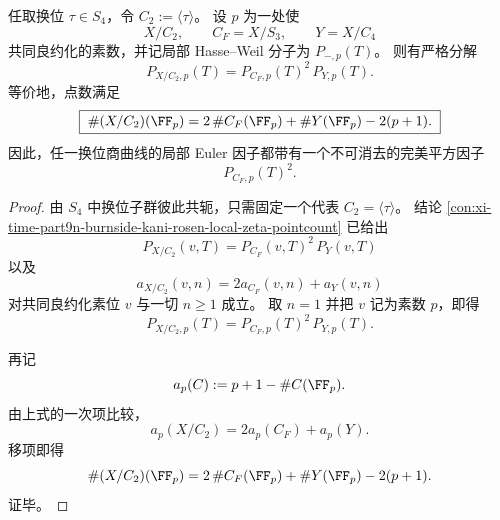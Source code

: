 \begin{theorem}\label{thm:conclusion-s4-transposition-quotient-square-euler-factor}
任取换位 \(\tau\in S_4\)，令 \(C_2:=\langle\tau\rangle\)。
设 \(p\) 为一处使
\[
X/C_2,\qquad C_F=X/S_3,\qquad Y=X/C_4
\]
共同良约化的素数，并记局部 Hasse--Weil 分子为 \(P_{-,p}(T)\)。
则有严格分解
\[
\boxed{\;
P_{X/C_2,p}(T)=P_{C_F,p}(T)^2\,P_{Y,p}(T).\;}
\]
等价地，点数满足
\[
\boxed{\;
\#(X/C_2)(\FF_p)
=
2\,\#C_F(\FF_p)+\#Y(\FF_p)-2(p+1).\;}
\]
因此，任一换位商曲线的局部 Euler 因子都带有一个不可消去的完美平方因子
\[
P_{C_F,p}(T)^2.
\]
\end{theorem}
\begin{proof}
由 \(S_4\) 中换位子群彼此共轭，只需固定一个代表 \(C_2=\langle\tau\rangle\)。
结论 \ref{con:xi-time-part9n-burnside-kani-rosen-local-zeta-pointcount} 已给出
\[
P_{X/C_2}(v,T)=P_{C_F}(v,T)^2\,P_Y(v,T)
\]
以及
\[
a_{X/C_2}(v,n)=2a_{C_F}(v,n)+a_Y(v,n)
\]
对共同良约化素位 \(v\) 与一切 \(n\ge 1\) 成立。
取 \(n=1\) 并把 \(v\) 记为素数 \(p\)，即得
\[
P_{X/C_2,p}(T)=P_{C_F,p}(T)^2\,P_{Y,p}(T).
\]

再记
\[
a_p(C):=p+1-\#C(\FF_p).
\]
由上式的一次项比较，
\[
a_p(X/C_2)=2a_p(C_F)+a_p(Y).
\]
移项即得
\[
\#(X/C_2)(\FF_p)
=
2\,\#C_F(\FF_p)+\#Y(\FF_p)-2(p+1).
\]
证毕。
\end{proof}

